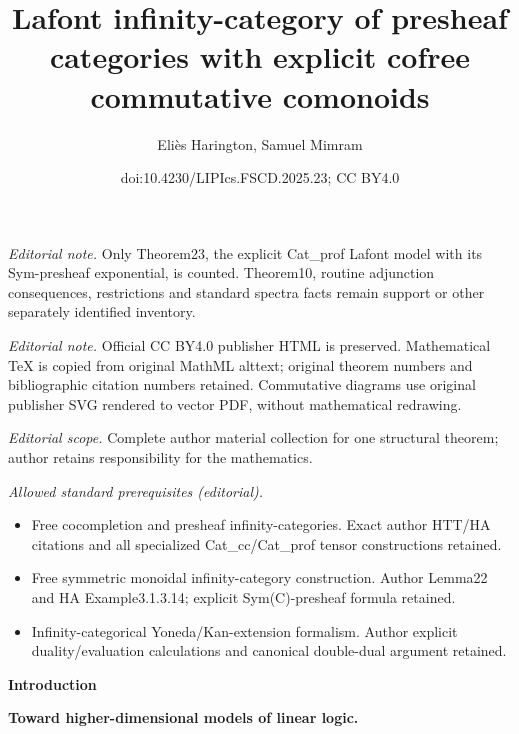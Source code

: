 \documentclass[10pt,a4paper]{article}
\title{Lafont infinity-category of presheaf categories with explicit cofree commutative comonoids}
\author{Eliès Harington, Samuel Mimram}
\date{doi:10.4230/LIPIcs.FSCD.2025.23; CC BY4.0}
\begin{document}
\maketitle
\noindent\textit{Editorial note.} Only Theorem23, the explicit Cat\_prof Lafont model with its Sym-presheaf exponential, is counted. Theorem10, routine adjunction consequences, restrictions and standard spectra facts remain support or other separately identified inventory.\par\medskip
\noindent\textit{Editorial note.} Official CC BY4.0 publisher HTML is preserved. Mathematical TeX is copied from original MathML alttext; original theorem numbers and bibliographic citation numbers retained. Commutative diagrams use original publisher SVG rendered to vector PDF, without mathematical redrawing.\par\medskip
\noindent\textit{Editorial scope.} Complete author material collection for one structural theorem; author retains responsibility for the mathematics.\par\medskip
\noindent\textit{Allowed standard prerequisites (editorial).}\begin{itemize}
\item Free cocompletion and presheaf infinity-categories. Exact author HTT/HA citations and all specialized Cat\_cc/Cat\_prof tensor constructions retained.
\item Free symmetric monoidal infinity-category construction. Author Lemma22 and HA Example3.1.3.14; explicit Sym(C)-presheaf formula retained.
\item Infinity-categorical Yoneda/Kan-extension formalism. Author explicit duality/evaluation calculations and canonical double-dual argument retained.
\end{itemize}\medskip

 
\par\medskip\noindent\textbf{Introduction}\par
 
 
\par\medskip\noindent\textbf{Toward higher-dimensional models of linear logic.}\par
 
 
\end{document}
